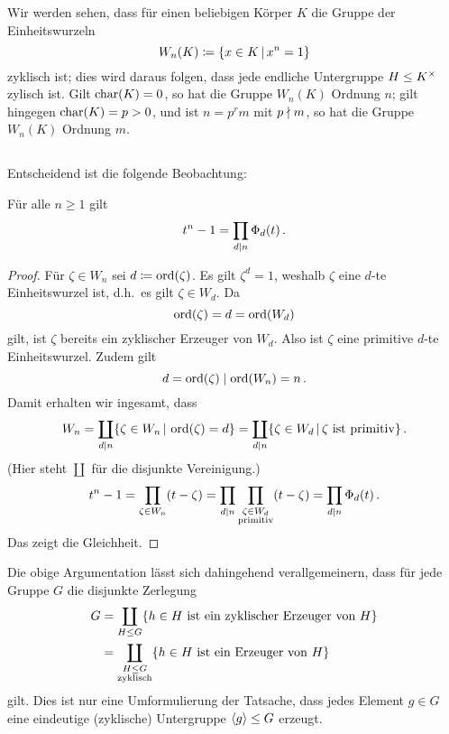 \begin{remark}
  Wir werden sehen, dass für einen beliebigen Körper $K$ die Gruppe der Einheitswurzeln
  \[
              W_n(K)
    \coloneqq \{x \in K \suchthat x^n = 1\}
  \]
  zyklisch ist;
  dies wird daraus folgen, dass jede endliche Untergruppe $H \leq K^\times$ zylisch ist.
  Gilt $\operatorname{char}(K) = 0$, so hat die Gruppe $W_n(K)$ Ordnung $n$;
  gilt hingegen $\operatorname{char}(K) = p > 0$, und ist $n = p^r m$ mit $p \mathrel{\nmid} m$, so hat die Gruppe $W_n(K)$ Ordnung $m$.
\end{remark}





\subsection{}

Entscheidend ist die folgende Beobachtung:

\begin{lemma}
  \label{lemma: decomposition into cyclotomic polynomials}
  Für alle $n \geq 1$ gilt
  \[
      t^n - 1
    = \prod_{d \mathrel{|} n} \Phi_d(t)\,.
  \]
\end{lemma}

\begin{proof}
  Für $\zeta \in W_n$ sei $d \coloneqq \operatorname{ord}(\zeta)$.
  Es gilt $\zeta^d = 1$, weshalb $\zeta$ eine $d$-te Einheitswurzel ist, d.h.\ es gilt $\zeta \in W_d$.
  Da
  \[
      \operatorname{ord}(\zeta)
    = d
    = \operatorname{ord}(W_d)
  \]
  gilt, ist $\zeta$ bereits ein zyklischer Erzeuger von $W_d$.
  Also ist $\zeta$ eine primitive $d$-te Einheitswurzel.
  Zudem gilt
  \[
              d
    =         \operatorname{ord}(\zeta)
    \mathrel{|}  \operatorname{ord}(W_n)
    =         n\,.
  \]
  Damit erhalten wir ingesamt, dass
  \[
      W_n
    = \coprod_{d \divides n} \{ \zeta \in W_n \suchthat \ord{\zeta} = d \}
    = \coprod_{d \divides n} \{ \zeta \in W_d \suchthat \text{$\zeta$ ist primitiv} \}\,.
  \]
  (Hier steht $\coprod$ für die disjunkte Vereinigung.)
  \[
      t^n - 1
    = \prod_{\zeta \in W_n} (t - \zeta)
    = \prod_{d \mathrel{|} n} \prod_{\substack{\zeta \in W_d \\ \text{primitiv}}} (t - \zeta)
    = \prod_{d \mathrel{|} n} \Phi_d(t)\,.
  \]
  Das zeigt die Gleichheit.
\end{proof}

\begin{remark}
  Die obige Argumentation lässt sich dahingehend verallgemeinern, dass für jede Gruppe $G$ die disjunkte Zerlegung
  \begin{align*}
        G
    &=  \coprod_{H \leq G} \{\text{$h \in H$ ist ein zyklischer Erzeuger von $H$}\}  \\
    &=  \coprod_{\substack{H \leq G \\ \text{zyklisch}}} \{\text{$h \in H$ ist ein Erzeuger von $H$}\}
  \end{align*}
  gilt.
  Dies ist nur eine Umformulierung der Tatsache, dass jedes Element $g \in G$ eine eindeutige (zyklische) Untergruppe $\langle g\rangle \leq G$ erzeugt.
\end{remark}

